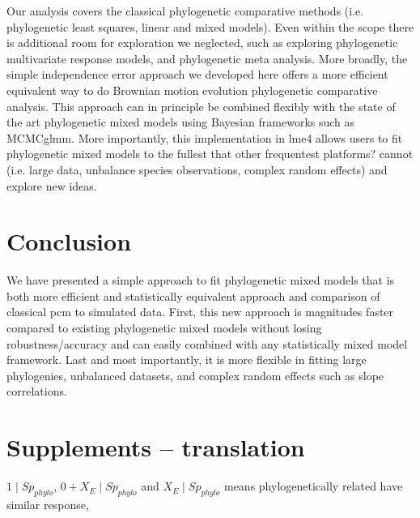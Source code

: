 Our analysis covers the classical phylogenetic comparative methods (i.e. phylogenetic least squares, linear and mixed models).
Even within the scope there is additional room for exploration we neglected, such as exploring phylogenetic multivariate response models, and phylogenetic meta analysis.
More broadly, the simple independence error approach we developed here offers a more efficient equivalent way to do Brownian motion evolution phylogenetic comparative analysis. 
This approach can in principle be combined flexibly with the state of the art phylogenetic mixed models using Bayesian frameworks such as MCMCglmm. 
More importantly, this implementation in lme4 allows users to fit phylogenetic mixed models to the fullest that other frequentest platforms? cannot (i.e. large data, unbalance species observations, complex random effects) and explore new ideas.

\section{Conclusion}

We have presented a simple approach to fit phylogenetic mixed models that is both more efficient and statistically equivalent approach and comparison of classical pcm to simulated data. 
First, this new approach is magnitudes faster compared to existing phylogenetic mixed models without losing robustness/accuracy and can easily combined with any statistically mixed model framework. 
Last and most importantly, it is more flexible in fitting large phylogenies, unbalanced datasets, and complex random effects such as slope correlations.



\newpage

\section{Supplements -- translation}

$1 \mid Sp_{phylo}$, $0 + X_{E} \mid Sp_{phylo}$ and $X_{E} \mid Sp_{phylo}$ means phylogenetically related have similar response,   

